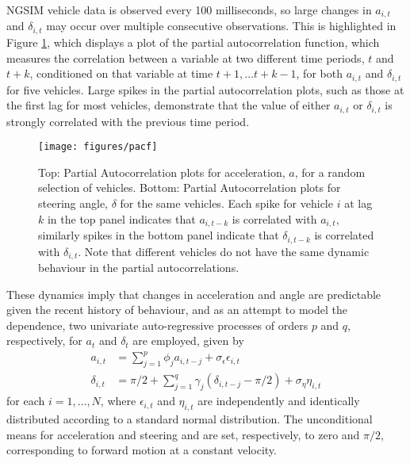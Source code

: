 \documentclass[
12pt, %
onehalfspacing, %
nohyperref, %
headsepline, %
chapterinoneline, %
]{MastersDoctoralThesis} %
\begin{document}
NGSIM vehicle data is observed every 100 milliseconds, so large changes in $a_{i, t}$ and $\delta_{i, t}$ may occur over multiple consecutive observations. This is highlighted in Figure \ref{fig:carspacf}, which displays a plot of the partial autocorrelation function, which measures the correlation between a variable at two different time periods, $t$ and $t + k$, conditioned on that variable at time $t + 1, \ldots t + k -1$, for both $a_{i, t}$ and $\delta_{i, t}$ for five vehicles. Large spikes in the partial autocorrelation plots, such as those at the first lag for most vehicles, demonstrate that the value of either $a_{i, t}$ or $\delta_{i, t}$ is strongly correlated with the previous time period. 
\\

\begin{figure}[htbp]
\centering
\texttt{[image: figures/pacf]}
\caption{Top: Partial Autocorrelation plots for acceleration, $a$, for a random selection of vehicles. Bottom: Partial Autocorrelation plots for steering angle, $\delta$ for the same vehicles. Each spike for vehicle $i$ at lag $k$ in the top panel indicates that $a_{i, t-k}$ is correlated with $a_{i, t}$, similarly spikes in the bottom panel indicate that $\delta_{i, t-k}$ is correlated with $\delta_{i, t}$. Note that different vehicles do not have the same dynamic behaviour in the partial autocorrelations.}
\label{fig:carspacf}
\end{figure}

These dynamics imply that changes in acceleration and angle are predictable given the recent history of behaviour, and as an attempt to model the dependence, two univariate auto-regressive processes of orders $p$ and $q$, respectively, for $a_t$ and $\delta_t$ are employed, given by
\begin{align}
a_{i, t} &= \sum_{j = 1}^p \phi_{j} a_{i, t-j} + \sigma_{\epsilon} \epsilon_{i, t} \label{cars:aAR} \\
\delta_{i, t} &= \pi/2 + \sum_{j = 1}^q \gamma_{j} (\delta_{i, t-j} - \pi/2) + \sigma_{\eta} \eta_{i, t} \label{cars:dAR}
\end{align}
for each $i = 1, \ldots, N$, where $\epsilon_{i, t}$ and $\eta_{i, t}$ are independently and identically distributed according to a standard normal distribution. The unconditional means for acceleration and steering and are set, respectively, to zero and $\pi/2$, corresponding to forward motion at a constant velocity.
\\
\end{document}
